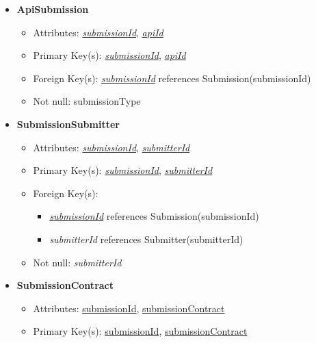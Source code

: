 \begin{itemize}
        \item \textbf{ApiSubmission}
        \begin{itemize}
            \item Attributes: \underline{\textit{submissionId}}, \underline{\textit{apiId}}
            \item Primary Key(s): \underline{\textit{submissionId}}, \underline{\textit{apiId}}
            \item Foreign Key(s): \underline{\textit{submissionId}} references Submission(submissionId)
            \item Not null: submissionType
        \end{itemize}

        \item \textbf{SubmissionSubmitter}
        \begin{itemize}
            \item Attributes: \underline{\textit{submissionId}}, \underline{\textit{submitterId}}
            \item Primary Key(s): \underline{\textit{submissionId}}, \underline{\textit{submitterId}}
            \item Foreign Key(s): 
            \begin{itemize}
                \item \underline{\textit{submissionId}} references Submission(submissionId)
                \item \textit{submitterId} references Submitter(submitterId)
            \end{itemize}
            \item Not null: \textit{submitterId}
        \end{itemize}

        \item \textbf{SubmissionContract}
        \begin{itemize}
            \item Attributes: \underline{submissionId}, \underline{submissionContract}
            \item Primary Key(s): \underline{submissionId}, \underline{submissionContract}
        \end{itemize}


\end{itemize}
